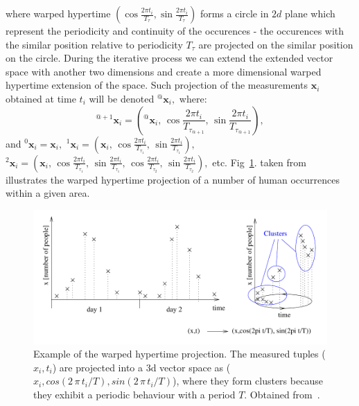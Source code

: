 where warped hypertime $\left(\cos{\frac{2\pi t_{i}}{T_{\tau}}}, \sin{\frac{2\pi t_{i}}{T_{\tau}}}\right)$ forms a circle in $2d$ plane which represent the periodicity and continuity of the occurences - the occurences with the similar position relative to periodicity $T_{\tau}$ are projected on the similar position on the circle.
%
%
During the iterative process we can extend the extended vector space with another two dimensions and create a more dimensional warped hypertime extension of the space. 
Such projection of the measurements $\mathbf{x}_i$ obtained at time $t_i$ will be denoted ${}^{@}\mathbf{x}_{i},$ where:
%
\begin{equation}\label{eqn:extension}
    {}^{@+1}\mathbf{x}_{i} = \left({}^{@}\mathbf{x}_{i}, \,\cos{\frac{2\pi t_{i}}{T_{\tau_{@+1}}}}, \, \sin{\frac{2\pi t_{i}}{T_{\tau_{@+1}}}}\right),
\end{equation}
%
and ${}^{0}\mathbf{x}_{i} = \mathbf{x}_{i},$ ${}^{1}\mathbf{x}_{i} = \left(\mathbf{x}_{i}, \,\cos{\frac{2\pi t_{i}}{T_{\tau_1}}}, \, \sin{\frac{2\pi t_{i}}{T_{\tau_1}}}\right),$ ${}^{2}\mathbf{x}_{i} = \left(\mathbf{x}_{i}, \,\cos{\frac{2\pi t_{i}}{T_{\tau_1}}}, \, \sin{\frac{2\pi t_{i}}{T_{\tau_1}}}, \,\cos{\frac{2\pi t_{i}}{T_{\tau_2}}}, \, \sin{\frac{2\pi t_{i}}{T_{\tau_2}}}\right),$ etc.
Fig~\ref{fig:hypertime}. taken from~\cite{removed} illustrates the warped hypertime projection of a number of human occurrences within a given area.
%
\begin{figure}
\begin{center}
    \includegraphics[width=0.7\columnwidth]{fig/hypertime1}
    \caption{Example of the warped hypertime projection. The measured tuples ($x_i,t_i$) are projected into a 3d vector space as ($x_i,cos(2\,\pi\,t_i/T),sin(2\,\pi\,t_i/T)$), where they form clusters because they exhibit a periodic behaviour with a period $T$. Obtained from~\cite{removed}.\label{fig:hypertime}}

\end{center}
\end{figure}


